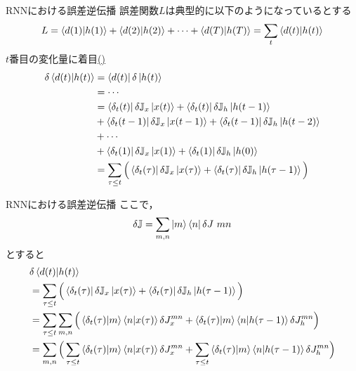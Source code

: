 \documentclass[dvipdfmx,10pt]{beamer}
\begin{document}
  \begin{frame}{RNNにおける誤差逆伝播}
    誤差関数$L$は典型的に以下のようになっているとする
    \begin{equation*}
      L = \braket{d(1)|h(1)} + \braket{d(2)|h(2)} + \cdots + \braket{d(T)|h(T)}= \sum_{t}\braket{d(t)|h(t)}
    \end{equation*}
    $t$番目の変化量に着目\hyperlink{計算1}{()}
    \begin{align*}
      \delta \braket{d(t)|h(t)} 
      &= \bra{d(t)} \delta \ket{h(t)} \ \\
      &= \cdots\\
      &= \bra{\delta_t (t)}\delta \mathbb{J}_x \ket{x(t)} + \bra{\delta_t (t)}\delta \mathbb{J}_h \ket{h(t-1)}\\
      &+ \bra{\delta_t (t-1)}\delta \mathbb{J}_x \ket{x(t-1)} + \bra{\delta_t (t-1)}\delta \mathbb{J}_h \ket{h(t-2)}\\
      &+ \cdots\\
      &+ \bra{\delta_t (1)}\delta \mathbb{J}_x \ket{x(1)} + \bra{\delta_t (1)}\delta \mathbb{J}_h \ket{h(0)}\\
      &= \sum_{\tau \leq t} \Big(\bra{\delta_t (\tau)}\delta \mathbb{J}_x \ket{x(\tau)} + \bra{\delta_t (\tau)}\delta \mathbb{J}_h \ket{h(\tau-1)} \Big)
    \end{align*}
    
  \end{frame}

  \begin{frame}{RNNにおける誤差逆伝播}
    ここで，
    \begin{equation*}
      \delta \mathbb{J} = \sum_{m,n} \ket{m}\bra{n}\delta J~{mn}
    \end{equation*}
    とすると
    \begin{align*}
      &\delta \braket{d(t)|h(t)} \\
      &= \sum_{\tau \leq t} \Big(\bra{\delta_t (\tau)}\delta \mathbb{J}_x \ket{x(\tau)} + \bra{\delta_t (\tau)}\delta \mathbb{J}_h \ket{h(\tau-1)} \Big)\\
      &= \sum_{\tau \leq t} \sum_{m,n} \Big( \braket{\delta_t (\tau)|m} \braket{n|x(\tau)}\delta J_x^{mn} + \braket{\delta_t (\tau)|m} \braket{n|h(\tau-1)}\delta J_h^{mn} \Big)\\
      &= \sum_{m,n} \Big( \sum_{\tau \leq t} \braket{\delta_t (\tau)|m} \braket{n|x(\tau)}\delta J_x^{mn} + \sum_{\tau \leq t} \braket{\delta_t (\tau)|m} \braket{n|h(\tau-1)}\delta J_h^{mn} \Big)
    \end{align*}
  \end{frame}
\end{document}
